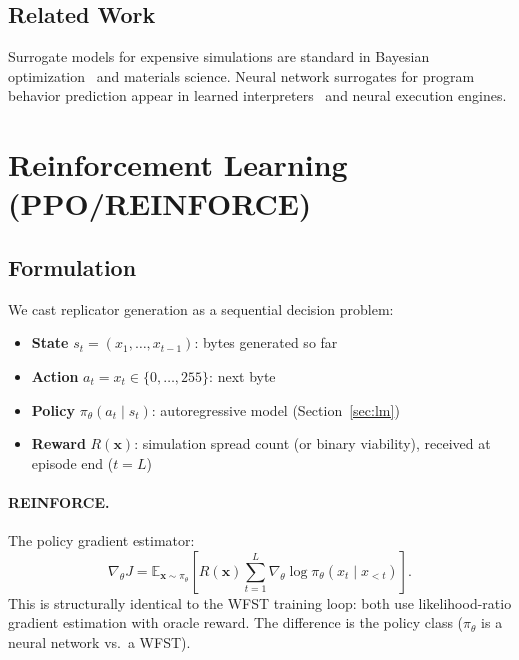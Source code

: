 \documentclass{article}
\begin{document}
\subsection{Related Work}

Surrogate models for expensive simulations are standard in Bayesian
optimization~\cite{snoek2012practical} and materials science.
Neural network surrogates for program behavior prediction appear in
learned interpreters~\cite{bieber2020learning} and neural execution
engines.


\section{Reinforcement Learning (PPO/REINFORCE)}
\label{sec:rl}

\subsection{Formulation}

We cast replicator generation as a sequential decision problem:
\begin{itemize}
  \item \textbf{State} $s_t = (x_1, \ldots, x_{t-1})$: bytes generated so far
  \item \textbf{Action} $a_t = x_t \in \{0,\ldots,255\}$: next byte
  \item \textbf{Policy} $\pi_\theta(a_t \mid s_t)$: autoregressive model
        (Section~\ref{sec:lm})
  \item \textbf{Reward} $R(\mathbf{x})$: simulation spread count (or binary
        viability), received at episode end ($t=L$)
\end{itemize}

\paragraph{REINFORCE.}
The policy gradient estimator:
\begin{equation}
  \nabla_\theta J = \mathbb{E}_{\mathbf{x} \sim \pi_\theta}
    \left[R(\mathbf{x}) \sum_{t=1}^{L} \nabla_\theta \log \pi_\theta(x_t \mid x_{<t})\right].
  \label{eq:reinforce}
\end{equation}
This is structurally identical to the WFST training loop: both use
likelihood-ratio gradient estimation with oracle reward.  The difference
is the policy class ($\pi_\theta$ is a neural network vs.\ a WFST).
\end{document}
